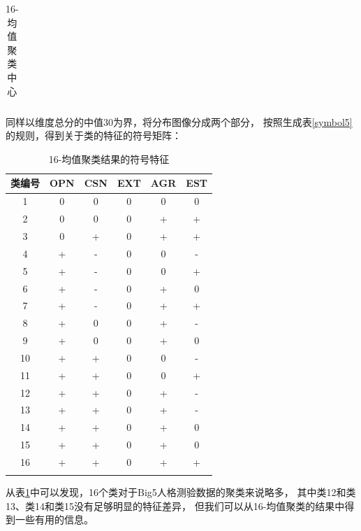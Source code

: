 \documentclass[UTF8]{ctexart}
\begin{document}
\begin{longtable}{c|c|c|c|c|c}
  \caption{16-均值聚类中心}
\end{longtable}
同样以维度总分的中值30为界，将分布图像分成两个部分，
按照生成表\ref{symbol5}的规则，得到关于类的特征的符号矩阵：
\begin{longtable}{c|c|c|c|c|c}
  \hline
  类编号 & OPN & CSN & EXT & AGR & EST \\\hline
  1   & 0   & 0   & 0   & 0   & 0   \\
  2   & 0   & 0   & 0   & +   & +   \\
  3   & 0   & +   & 0   & +   & +   \\
  4   & +   & -   & 0   & 0   & -   \\
  5   & +   & -   & 0   & 0   & +   \\
  6   & +   & -   & 0   & +   & 0   \\
  7   & +   & -   & 0   & +   & +   \\
  8   & +   & 0   & 0   & +   & -   \\
  9   & +   & 0   & 0   & +   & 0   \\
  10  & +   & +   & 0   & 0   & -   \\
  11  & +   & +   & 0   & 0   & +   \\
  12  & +   & +   & 0   & +   & -   \\
  13  & +   & +   & 0   & +   & -   \\
  14  & +   & +   & 0   & +   & 0   \\
  15  & +   & +   & 0   & +   & 0   \\
  16  & +   & +   & 0   & +   & +   \\\hline
  \caption{16-均值聚类结果的符号特征}
  \label{symbol16}
\end{longtable}
从表\ref{symbol16}中可以发现，16个类对于Big5人格测验数据的聚类来说略多，
其中类12和类13、类14和类15没有足够明显的特征差异，
但我们可以从16-均值聚类的结果中得到一些有用的信息。\par
\end{document}
